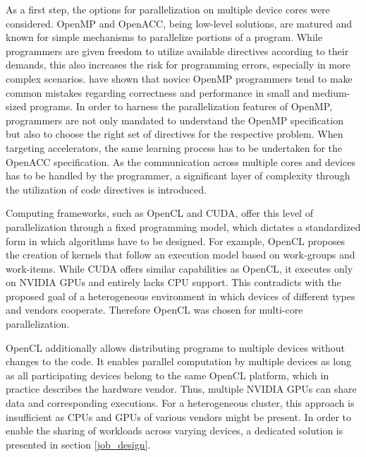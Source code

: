 As a first step, the options for parallelization on multiple device cores were considered. OpenMP and OpenACC, being low-level solutions, are matured and known for simple mechanisms to parallelize portions of a program. While programmers are given freedom to utilize available directives according to their demands, this also increases the risk for programming errors, especially in more complex scenarios. \citeauthor{openmp_mistakes} have shown that novice OpenMP programmers tend to make common mistakes regarding correctness and performance in small and medium-sized programs\cite{openmp_mistakes}. In order to harness the parallelization features of OpenMP, programmers are not only mandated to understand the OpenMP specification but also to choose the right set of directives for the respective problem. When targeting accelerators, the same learning process has to be undertaken for the OpenACC specification. As the communication across multiple cores and devices has to be handled by the programmer, a significant layer of complexity through the utilization of code directives is introduced.

Computing frameworks, such as OpenCL and CUDA, offer this level of parallelization through a fixed programming model, which dictates a standardized form in which algorithms have to be designed. For example, OpenCL proposes the creation of kernels that follow an execution model based on work-groups and work-items. While CUDA offers similar capabilities as OpenCL, it executes only on NVIDIA GPUs and entirely lacks CPU support. This contradicts with the proposed goal of a heterogeneous environment in which devices of different types and vendors cooperate. Therefore OpenCL was chosen for multi-core parallelization.

OpenCL additionally allows distributing programs to multiple devices without changes to the code. It enables parallel computation by multiple devices as long as all participating devices belong to the same OpenCL platform, which in practice describes the hardware vendor. Thus, multiple NVIDIA GPUs can share data and corresponding executions. For a heterogeneous cluster, this approach is insufficient as CPUs and GPUs of various vendors might be present. In order to enable the sharing of workloads across varying devices, a dedicated solution is presented in section \ref{job_design}.

